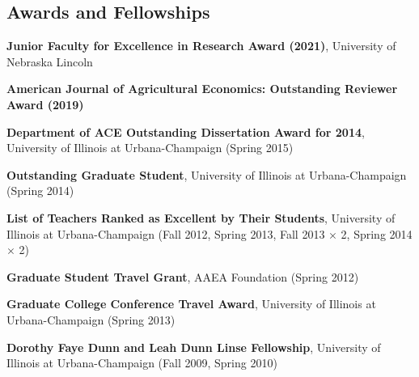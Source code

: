 \documentclass[10pt,margin,line]{res}
\newenvironment{list1}{
  \begin{list}{\ding{113}}{%
      \setlength{\itemsep}{0in}
      \setlength{\parsep}{0in} \setlength{\parskip}{0in}
      \setlength{\topsep}{0in} \setlength{\partopsep}{0in}
      \setlength{\leftmargin}{0.17in}}}{\end{list}}
\begin{document}
\begin{resume}
\section{\sc Awards and Fellowships}
\begin{list1}
\item[] \textbf{Junior Faculty for Excellence in Research Award (2021)}, University of Nebraska Lincoln
\vspace*{.05in}
\item[] \textbf{American Journal of Agricultural Economics: Outstanding Reviewer Award (2019)}
\vspace*{.05in}
\item[] \textbf{Department of ACE Outstanding Dissertation Award for 2014}, University of Illinois at Urbana-Champaign (Spring 2015)
\vspace*{.05in}
\item[] \textbf{Outstanding Graduate Student}, University of Illinois at Urbana-Champaign (Spring 2014)
\vspace*{.05in}
\item[] \textbf{List of Teachers Ranked as Excellent by Their Students}, University of Illinois at Urbana-Champaign (Fall 2012, Spring 2013, Fall 2013 $\times$ 2, Spring 2014 $\times$ 2)
\vspace*{.05in}
\item[] \textbf{Graduate Student Travel Grant}, AAEA Foundation (Spring 2012)
\vspace*{.05in}
\item[] \textbf{Graduate College Conference Travel Award}, University of Illinois at Urbana-Champaign (Spring 2013)
\vspace*{.05in}
\item[] \textbf{Dorothy Faye Dunn and Leah Dunn Linse Fellowship}, University of Illinois at Urbana-Champaign (Fall 2009, Spring 2010)
\end{list1}




\end{resume}
\end{document}
